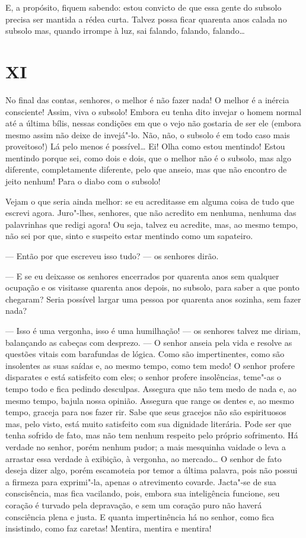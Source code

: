 E, a propósito, fiquem sabendo: estou convicto de que essa gente do
subsolo precisa ser mantida a rédea curta. Talvez possa ficar quarenta
anos calada no subsolo mas, quando irrompe à luz, sai falando, falando,
falando\ldots{}

\section{XI}

No final das contas, senhores, o melhor é não fazer nada! O melhor é a
inércia consciente! Assim, viva o subsolo! Embora eu tenha dito invejar
o homem normal até a última bílis, nessas condições em que o vejo não
gostaria de ser ele (embora mesmo assim não deixe de invejá"-lo. Não,
não, o subsolo é em todo caso mais proveitoso!) Lá pelo menos é
possível\ldots{} Ei! Olha como estou mentindo! Estou mentindo porque sei,
como dois e dois, que o melhor não é o subsolo, mas algo diferente,
completamente diferente, pelo que anseio, mas que não encontro de jeito
nenhum! Para o diabo com o subsolo!

Vejam o que seria ainda melhor: se eu acreditasse em alguma coisa de
tudo que escrevi agora. Juro"-lhes, senhores, que não acredito em
nenhuma, nenhuma das palavrinhas que redigi agora! Ou seja, talvez eu
acredite, mas, ao mesmo tempo, não sei por que, sinto e suspeito estar
mentindo como um sapateiro.

--- Então por que escreveu isso tudo? --- os senhores dirão.

--- E se eu deixasse os senhores encerrados por quarenta anos sem qualquer
ocupação e os visitasse quarenta anos depois, no subsolo, para saber a
que ponto chegaram? Seria possível largar uma pessoa por quarenta anos
sozinha, sem fazer nada?

--- Isso é uma vergonha, isso é uma humilhação! --- os senhores talvez me
diriam, balançando as cabeças com desprezo. --- O senhor anseia pela vida
e resolve as questões vitais com barafundas de lógica. Como são
impertinentes, como são insolentes as suas saídas e, ao mesmo tempo,
como tem medo! O senhor profere disparates e está satisfeito com eles; o
senhor profere insolências, teme"-as o tempo todo e fica pedindo
desculpas. Assegura que não tem medo de nada e, ao mesmo tempo, bajula
nossa opinião. Assegura que range os dentes e, ao mesmo tempo, graceja
para nos fazer rir. Sabe que seus gracejos não são espirituosos mas,
pelo visto, está muito satisfeito com sua dignidade literária. Pode ser
que tenha sofrido de fato, mas não tem nenhum respeito pelo próprio
sofrimento. Há verdade no senhor, porém nenhum pudor; a mais mesquinha
vaidade o leva a arrastar essa verdade à exibição, à vergonha, ao
mercado\ldots{} O senhor de fato deseja dizer algo, porém escamoteia por
temor a última palavra, pois não possui a firmeza para exprimi"-la,
apenas o atrevimento covarde. Jacta"-se de sua conscisência, mas fica
vacilando, pois, embora sua inteligência funcione, seu coração é turvado
pela depravação, e sem um coração puro não haverá consciência plena e
justa. E quanta impertinência há no senhor, como fica insistindo, como
faz caretas! Mentira, mentira e mentira!

